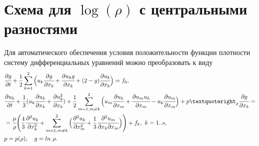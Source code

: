 \section{Схема для $\log(\rho)$ с центральными разностями}
\label{scheme1}

Для автоматического обеспечения условия положительности функции плотности систему дифференциальных уравнений можно преобразовать к виду
\begin{align*}
& \cfrac{\partial g}{\partial t} + \frac{1}{2}\sum_{k=1}^{2}\Big(u_k\cfrac{\partial g}{\partial x_k}+
  \cfrac{\partial u_k g}{\partial x_k} + (2-g)\cfrac{\partial u_k}{\partial x_k}\Big) = f_0,\\
& \cfrac{\partial u_k}{\partial t} + \frac{1}{3}(u_k\cfrac{\partial u_k}{\partial x_k} + 
  \cfrac{\partial u_k^2}{\partial x_k})
  + \frac{1}{2}\sum_{m=1,m\neq k}^{2}\Big( u_m\cfrac{\partial u_k}{\partial x_m}+
  \cfrac{\partial u_m u_k}{\partial x_m} - u_k\cfrac{\partial u_m}{\partial x_m}\Big)
  + p’_{\rho } \cfrac{\partial g}{\partial x_k} = \\
& = \cfrac{\mu}{\rho}\Bigg( \frac{4}{3} \cfrac{\partial^2 u_k}{\partial x_k^2} + 
  \sum_{m=1,m\neq k}^{2}\Big( \cfrac{\partial^2 u_k}{\partial x_m^2} + 
  \frac{1}{3} \cfrac{\partial^2 u_m}{\partial x_k \partial x_m} \Big)\Bigg) + f_k,\ k = 1..s,\\
& p = p(\rho), \quad g = ln\ \rho.
\end{align*}

